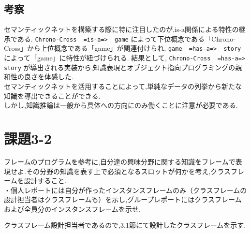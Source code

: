 \documentclass[uplatex,12pt]{jsarticle}
\begin{document}
\subsection{考察}
セマンティックネットを構築する際に特に注目したのが,is-a関係による特性の継承である.
\verb|Chrono-Cross  =is-a=>  game| によって下位概念である「Chrono-Cross」から上位概念である「game」が関連付けられ,
\verb|game  =has-a=>  story| によって「game」に特性が紐づけられる.
結果として, \verb|Chrono-Cross  =has-a=>  story| が導出される実装から,知識表現とオブジェクト指向プログラミングの親和性の良さを体感した. \\
セマンティックネットを活用することによって,単純なデータの列挙から新たな知識を導出できることができる. \\
しかし,知識推論は一般から具体への方向にのみ働くことに注意が必要である.


\section{課題3-2}
\begin{screen}
    フレームのプログラムを参考に,自分達の興味分野に関する知識をフレームで表現せよ.その分野の知識を表す上で必須となるスロットが何かを考え,クラスフレームを設計すること. \\
    ・個人レポートには自分が作ったインスタンスフレームのみ（クラスフレームの設計担当者はクラスフレームも）を示し,グループレポートにはクラスフレームおよび全員分のインスタンスフレームを示せ.
\end{screen}
クラスフレーム設計担当者であるので,3.1節にて設計したクラスフレームを示す.
\end{document}

